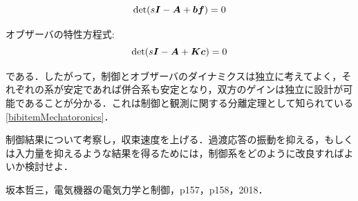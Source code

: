 \documentclass[12pt]{jsarticle}
\begin{document}
\begin{description}
\begin{description}
    \begin{equation}
      {\rm det}(s{\bm I} - {\bm A} + {\bm b}{\bm f}) = 0
    \end{equation}
    \item オブザーバの特性方程式:
    \begin{equation}
      {\rm det}(s{\bm I} - {\bm A} + {\bm K}{\bm c}) = 0
    \end{equation}
  \end{description}
である．したがって，制御とオブザーバのダイナミクスは独立に考えてよく，それぞれの系が安定であれば併合系も安定となり，双方のゲインは独立に設計が可能であることが分かる．これは制御と観測に関する分離定理として知られている\ref{bibitemMechatoronics}．
\begin{equation}
\end{equation}
  \item[(2)] 制御結果について考察し，収束速度を上げる．過渡応答の振動を抑える，もしくは入力量を抑えるような結果を得るためには，制御系をどのように改良すればよいか検討せよ．
\end{description}

\begin{thebibliography}{9}
   坂本哲三，電気機器の電気力学と制御，p157，p158，2018．
\end{thebibliography}
\end{document}
